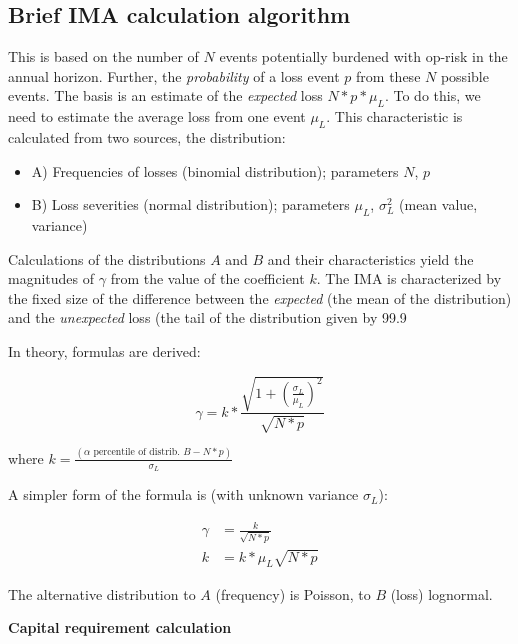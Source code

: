 \documentclass{article}
\begin{document}
\subsection{Brief IMA calculation algorithm}

This is based on the number of $N$ events potentially burdened with op-risk in the annual horizon. Further, the \emph{probability} of a loss event $p$ from these $N$ possible events.
The basis is an estimate of the \emph{expected} loss $N * p * \mu_L$. To do this, we need to estimate the average loss from one event $\mu_L$. This characteristic is calculated from two sources, the distribution:

\begin{itemize}
  \item A) Frequencies of losses (binomial distribution); parameters $N$, $p$
  \item B) Loss severities (normal distribution); parameters $\mu_L$, $\sigma_L^2$ (mean value, variance)
\end{itemize}

Calculations of the distributions $A$ and $B$ and their characteristics yield the magnitudes of $\gamma$ from the value of the coefficient $k$. The IMA is characterized by the fixed size of the difference between the \emph{expected} (the mean of the distribution) and the \emph{unexpected} loss (the tail of the distribution given by 99.9%

In theory, formulas are derived:

\begin{equation}
  \gamma = k * \frac{\sqrt{1 + (\frac{\sigma_L}{\mu_L})^2}}{\sqrt{N * p}}
\end{equation}

where $k = \frac{(\alpha \textrm{ percentile of distrib.  } B - N * p)}{\sigma_L}$

A simpler form of the formula is (with unknown variance $\sigma_L$):

\begin{equation}
  \begin{aligned}
  \gamma &= \frac{k}{\sqrt{N * p}} \\
       k &= k * \mu_L \sqrt{N * p}
  \end{aligned}
\end{equation}

The alternative distribution to $A$ (frequency) is Poisson, to $B$ (loss) lognormal.

\textbf{Capital requirement calculation}
\end{document}

